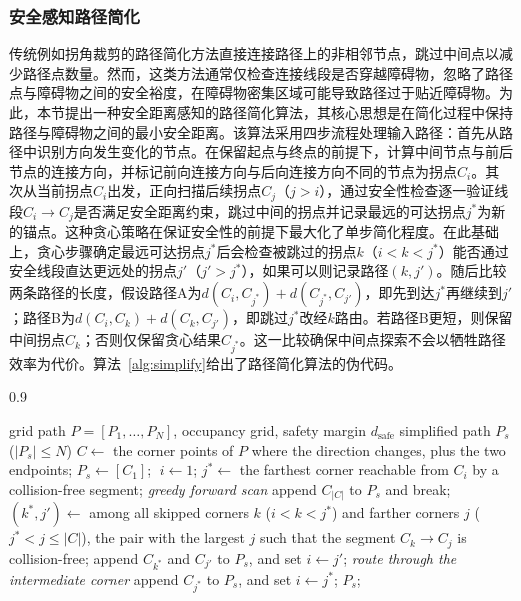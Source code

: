 \documentclass[lettersize,journal]{IEEEtran}
\begin{document}
\subsubsection{安全感知路径简化}
传统例如拐角裁剪的路径简化方法直接连接路径上的非相邻节点，跳过中间点以减少路径点数量。然而，这类方法通常仅检查连接线段是否穿越障碍物，忽略了路径点与障碍物之间的安全裕度，在障碍物密集区域可能导致路径过于贴近障碍物。为此，本节提出一种安全距离感知的路径简化算法，其核心思想是在简化过程中保持路径与障碍物之间的最小安全距离。该算法采用四步流程处理输入路径：首先从路径中识别方向发生变化的节点。在保留起点与终点的前提下，计算中间节点与前后节点的连接方向，并标记前向连接方向与后向连接方向不同的节点为拐点$C_i$。其次从当前拐点$C_i$出发，正向扫描后续拐点$C_j$（$j > i$），通过安全性检查逐一验证线段$C_i \to C_j$是否满足安全距离约束，跳过中间的拐点并记录最远的可达拐点$j^{*}$为新的锚点。这种贪心策略在保证安全性的前提下最大化了单步简化程度。在此基础上，贪心步骤确定最远可达拐点$j^{*}$后会检查被跳过的拐点$k$（$i < k < j^{*}$）能否通过安全线段直达更远处的拐点$j'$（$j' > j^{*}$），如果可以则记录路径$(k, j')$。随后比较两条路径的长度，假设路径A为$d(C_i, C_{j^{*}}) + d(C_{j^{*}}, C_{j'})$，即先到达$j^{*}$再继续到$j'$；路径B为$d(C_i, C_k) + d(C_k, C_{j'})$，即跳过$j^{*}$改经$k$路由。若路径B更短，则保留中间拐点$C_k$；否则仅保留贪心结果$C_{j^{*}}$。这一比较确保中间点探索不会以牺牲路径效率为代价。算法~\textcolor{blue}{\ref{alg:simplify}}给出了路径简化算法的伪代码。

\begin{algorithm}[htbp]
\caption{Safety-distance-aware path simplification}
\label{alg:simplify}
\begin{spacing}{0.9}
\begin{algorithmic}[1]
\REQUIRE grid path $P = [P_1, \ldots, P_N]$, occupancy grid, safety margin $d_{\mathrm{safe}}$
\ENSURE simplified path $P_s$ ($|P_s| \leq N$)
\STATE $C \gets$ the corner points of $P$ where the direction changes, plus the two endpoints;
\STATE $P_s \gets [C_1]$; $\; i \gets 1$;
\STATE $j^{*} \gets$ the farthest corner reachable from $C_i$ by a collision-free segment; \quad\textit{greedy forward scan}
\STATE append $C_{|C|}$ to $P_s$ and break;
\ENDIF
\STATE $(k^{*}, j') \gets$ among all skipped corners $k$ ($i < k < j^{*}$) and farther corners $j$ ($j^{*} < j \leq |C|$), the pair with the largest $j$ such that the segment $C_k \to C_j$ is collision-free;
\STATE append $C_{k^{*}}$ and $C_{j'}$ to $P_s$, and set $i \gets j'$; \quad\textit{route through the intermediate corner}
\ELSE
\STATE append $C_{j^{*}}$ to $P_s$, and set $i \gets j^{*}$;
\ENDIF
\ENDWHILE
\RETURN $P_s$;
\end{algorithmic}
\end{spacing}
\end{algorithm}
\end{document}
